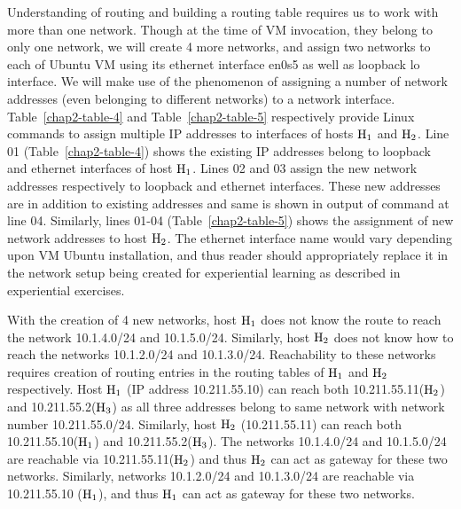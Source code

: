 \begin{multicols}{2}
Understanding of routing and building a routing table requires us to work with more than one network. Though at the time of VM invocation, they belong to only one network, we will create 4 more networks, and assign two networks to each of Ubuntu VM using its ethernet interface en0s5 as well as loopback lo interface. We will make use of the phenomenon of assigning a number of network addresses (even belonging to different networks) to a network interface.  Table~\ref{chap2-table-4} and Table~\ref{chap2-table-5} respectively provide Linux commands to assign multiple IP addresses to interfaces of hosts ${\rm H}_{1}$ and ${\rm H}_{2}$. Line 01 (Table~\ref{chap2-table-4}) shows the existing IP addresses belong to loopback and ethernet interfaces of host ${\rm H}_{1}$.  Lines 02 and 03 assign the new network addresses respectively to loopback and ethernet interfaces. These new addresses are in addition to existing addresses and same is shown in output of command at line 04. Similarly, lines 01-04 (Table~\ref{chap2-table-5}) shows the assignment of new network addresses to host ${\rm H}_{2}$. The ethernet interface name would vary depending upon VM Ubuntu installation, and thus reader should appropriately replace it in the network setup being created for experiential learning as described in experiential exercises.


\vspace{-.3cm}

With the creation of 4 new networks, host ${\rm H}_{1}$ does not know the route to reach the network 10.1.4.0/24 and 10.1.5.0/24. Similarly, host ${\rm H}_{2}$ does not know how to reach the networks 10.1.2.0/24 and 10.1.3.0/24. Reachability to these networks requires creation of routing entries in the routing tables of ${\rm H}_{1}$ and ${\rm H}_{2}$ respectively. Host ${\rm H}_{1}$ (IP address 10.211.55.10) can reach both 10.211.55.11(${\rm H}_{2}$) and 10.211.55.2(${\rm H}_{3}$) as all three addresses belong to same network with network number 10.211.55.0/24. Similarly, host ${\rm H}_{2}$ (10.211.55.11) can reach both 10.211.55.10(${\rm H}_{1}$) and 10.211.55.2(${\rm H}_{3}$). The networks 10.1.4.0/24 and 10.1.5.0/24 are reachable via 10.211.55.11(${\rm H}_{2}$) and thus ${\rm H}_{2}$ can act as gateway for these two networks. Similarly, networks 10.1.2.0/24 and 10.1.3.0/24 are reachable via 10.211.55.10 (${\rm H}_{1}$), and thus ${\rm H}_{1}$ can act as gateway for these two networks. 


\end{multicols}
